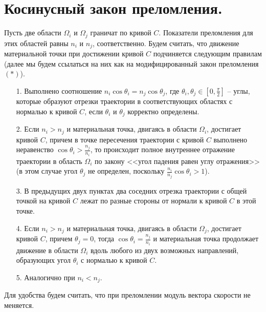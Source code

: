 \section{Косинусный закон преломления.}\label{sec:ch3/sec2}
Пусть две области $\Omega_i$ и $\Omega_j$ граничат по кривой $C$. 
Показатели преломления для этих областей равны $n_i$ и $n_j$, соответственно.
Будем считать, что движение материальной точки при достижении кривой $C$ подчиняется следующим правилам (далее мы будем ссылаться на них как на модифицированный закон преломления $(\ast)$).
\begin{itemize}
\item[1.] Выполнено соотношение $n_i \cos \theta_i = n_j \cos \theta_j $, где $\theta_i, \theta_j \in [0,\frac{\pi}{2} ]$ -- углы, которые образуют отрезки траектории   в соответствующих областях с нормалью к кривой $C$, если $\theta_i$ и $\theta_j$ корректно определены.
\item[2.] Если $n_i > n_j$ и материальная точка, двигаясь в области $\Omega_i$, достигает кривой $C$, причем в точке пересечения траектории с кривой $C$ выполнено неравенство $\cos \theta_i > \frac{n_j}{n_i}$, то происходит полное внутреннее отражение траектории в область $\Omega_i$ по закону <<угол падения равен углу отражения>> (в этом случае угол $\theta_j$ не определен, поскольку $\frac{n_i}{n_j} \cos \theta_i > 1$). 
\item[3.] В предыдущих двух пунктах два соседних отрезка траектории с общей точкой на кривой $C$ лежат по разные стороны от нормали к кривой $C$ в этой точке.
\item[4.] Если $n_i > n_j$ и материальная точка, двигаясь в области $\Omega_j$, достигает кривой $C$, причем $\theta_j = 0$, тогда $\cos \theta_i = \frac{n_j}{n_i}$ и материальная точка продолжает движение в области $\Omega_i$ вдоль любого из двух возможных направлений, образующих угол $\theta_i$ с нормалью к кривой $C$.
\item[5.] Аналогично при $n_i < n_j$.
\end{itemize}
Для удобства будем считать, что при преломлении модуль вектора скорости не меняется.

